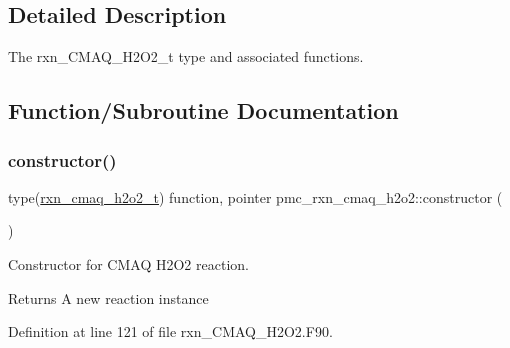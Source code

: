 \subsection{Detailed Description}
The rxn\+\_\+\+C\+M\+A\+Q\+\_\+\+H2\+O2\+\_\+t type and associated functions. 

\subsection{Function/\+Subroutine Documentation}
\mbox{\label{namespacepmc__rxn__cmaq__h2o2_aa4313a0f6cbaa981af9bb374696eb4a5}} 
\subsubsection{\texorpdfstring{constructor()}{constructor()}}
{\footnotesize\ttfamily type(\mbox{\hyperlink{structpmc__rxn__cmaq__h2o2_1_1rxn__cmaq__h2o2__t}{rxn\+\_\+cmaq\+\_\+h2o2\+\_\+t}}) function, pointer pmc\+\_\+rxn\+\_\+cmaq\+\_\+h2o2\+::constructor (\begin{DoxyParamCaption}{ }\end{DoxyParamCaption})\hspace{0.3cm}{\ttfamily [private]}}



Constructor for C\+M\+AQ H2\+O2 reaction. 

\begin{DoxyReturn}{Returns}
A new reaction instance 
\end{DoxyReturn}


Definition at line 121 of file rxn\+\_\+\+C\+M\+A\+Q\+\_\+\+H2\+O2.\+F90.

\mbox{\label{namespacepmc__rxn__cmaq__h2o2_ac9b479994bd896861267eb07f73efdff}} 
